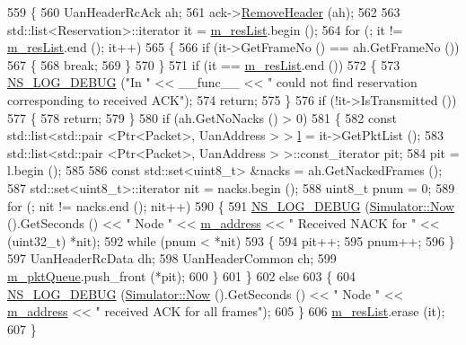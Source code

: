 \begin{DoxyCode}
559 \{
560   UanHeaderRcAck ah;
561   ack->\hyperlink{classns3_1_1Packet_a0961eccf975d75f902d40956c93ba63e}{RemoveHeader} (ah);
562 
563   std::list<Reservation>::iterator it = \hyperlink{classns3_1_1UanMacRc_ab1c6828d66f3809cd023b279c6c661a1}{m\_resList}.begin ();
564   \textcolor{keywordflow}{for} (; it != \hyperlink{classns3_1_1UanMacRc_ab1c6828d66f3809cd023b279c6c661a1}{m\_resList}.end (); it++)
565     \{
566       \textcolor{keywordflow}{if} (it->GetFrameNo () == ah.GetFrameNo ())
567         \{
568           \textcolor{keywordflow}{break};
569         \}
570     \}
571   \textcolor{keywordflow}{if} (it == \hyperlink{classns3_1_1UanMacRc_ab1c6828d66f3809cd023b279c6c661a1}{m\_resList}.end ())
572     \{
573       \hyperlink{group__logging_ga413f1886406d49f59a6a0a89b77b4d0a}{NS\_LOG\_DEBUG} (\textcolor{stringliteral}{"In "} << \_\_func\_\_ << \textcolor{stringliteral}{" could not find reservation corresponding to received
       ACK"});
574       \textcolor{keywordflow}{return};
575     \}
576   \textcolor{keywordflow}{if} (!it->IsTransmitted ())
577     \{
578       \textcolor{keywordflow}{return};
579     \}
580   \textcolor{keywordflow}{if} (ah.GetNoNacks () > 0)
581     \{
582       \textcolor{keyword}{const} std::list<std::pair <Ptr<Packet>, UanAddress > > \hyperlink{buildings__pathloss_8m_a5b54c0a045f179bcbbbc9abcb8b5cd4c}{l} = it->GetPktList ();
583       std::list<std::pair <Ptr<Packet>, UanAddress > >::const\_iterator pit;
584       pit = l.begin ();
585 
586       \textcolor{keyword}{const} std::set<uint8\_t> &nacks = ah.GetNackedFrames ();
587       std::set<uint8\_t>::iterator nit = nacks.begin ();
588       uint8\_t pnum = 0;
589       \textcolor{keywordflow}{for} (; nit != nacks.end (); nit++)
590         \{
591           \hyperlink{group__logging_ga413f1886406d49f59a6a0a89b77b4d0a}{NS\_LOG\_DEBUG} (\hyperlink{classns3_1_1Simulator_ac3178fa975b419f7875e7105be122800}{Simulator::Now} ().GetSeconds () << \textcolor{stringliteral}{" Node "} << 
      \hyperlink{classns3_1_1UanMacRc_ac389a0236fcf75155c45a9a1cdf0f288}{m\_address} << \textcolor{stringliteral}{" Received NACK for "} << (uint32\_t) *nit);
592           \textcolor{keywordflow}{while} (pnum < *nit)
593             \{
594               pit++;
595               pnum++;
596             \}
597           UanHeaderRcData dh;
598           UanHeaderCommon ch;
599           \hyperlink{classns3_1_1UanMacRc_ae1b75933c06f5f791dfba9065658adfd}{m\_pktQueue}.push\_front (*pit);
600         \}
601     \}
602   \textcolor{keywordflow}{else}
603     \{
604       \hyperlink{group__logging_ga413f1886406d49f59a6a0a89b77b4d0a}{NS\_LOG\_DEBUG} (\hyperlink{classns3_1_1Simulator_ac3178fa975b419f7875e7105be122800}{Simulator::Now} ().GetSeconds () << \textcolor{stringliteral}{" Node "} << 
      \hyperlink{classns3_1_1UanMacRc_ac389a0236fcf75155c45a9a1cdf0f288}{m\_address} << \textcolor{stringliteral}{" received ACK for all frames"});
605     \}
606   \hyperlink{classns3_1_1UanMacRc_ab1c6828d66f3809cd023b279c6c661a1}{m\_resList}.erase (it);
607 \}
\end{DoxyCode}


